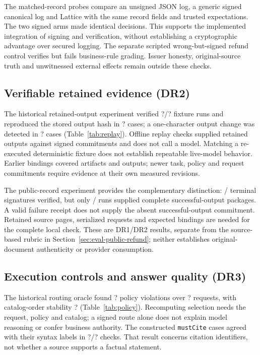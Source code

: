 \documentclass[11pt]{article}
\newcommand{\code}[1]{\texttt{\small #1}}
\newcommand{\MustCiteAgree}{?}
\newcommand{\MustCiteCases}{?}
\newcommand{\RoutePermSame}{?}
\newcommand{\RouteViolations}{?}
\newcommand{\RouteRequests}{?}
\newcommand{\ReplayRuns}{?}
\newcommand{\ReplayVerified}{?}
\newcommand{\ReplayHash}{?}
\newcommand{\ReplayAltered}{?}
\begin{document}
The matched-record probes compare an unsigned JSON log, a generic signed canonical log and Lattice with the same record fields and trusted expectations. The two signed arms made identical decisions. This supports the implemented integration of signing and verification, without establishing a cryptographic advantage over secured logging. The separate scripted wrong-but-signed refund control verifies but fails business-rule grading. Issuer honesty, original-source truth and unwitnessed external effects remain outside these checks.

\CfourThreatTable
\FloatBarrier

\subsection{Verifiable retained evidence (DR2)}

The historical retained-output experiment verified \ReplayVerified{}/\ReplayRuns{} fixture runs and reproduced the stored output hash in \ReplayHash{} cases; a one-character output change was detected in \ReplayAltered{} cases (Table~\ref{tab:replay}). Offline replay checks supplied retained outputs against signed commitments and does not call a model. Matching a re-executed deterministic fixture does not establish repeatable live-model behavior. Earlier bindings covered artifacts and outputs; newer task, policy and request commitments require evidence at their own measured revisions.

The public-record experiment provides the complementary distinction: \CfourPublicSignatures{}/\CfourPublicPlanned{} terminal signatures verified, but only \CfourPublicPackages{}/\CfourPublicPlanned{} runs supplied complete successful-output packages. A valid failure receipt does not supply the absent successful-output commitment. Retained source pages, serialized requests and expected bindings are needed for the complete local check. These are DR1/DR2 results, separate from the source-based rubric in Section~\ref{sec:eval-public-refund}; neither establishes original-document authenticity or provider consumption.

\subsection{Execution controls and answer quality (DR3)}\label{sec:eval-policy}

The historical routing oracle found \RouteViolations{} policy violations over \RouteRequests{} requests, with catalog-order stability \RoutePermSame{} (Table~\ref{tab:policy}). Recomputing selection needs the request, policy and catalog; a signed route alone does not explain model reasoning or confer business authority. The constructed \code{mustCite} cases agreed with their syntax labels in \MustCiteAgree{}/\MustCiteCases{} checks. That result concerns citation identifiers, not whether a source supports a factual statement.
\end{document}
